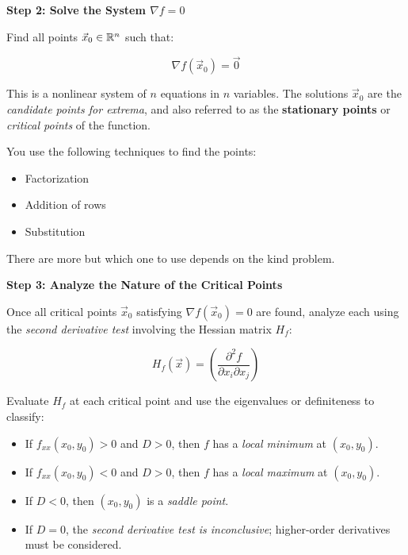 \textbf{Step 2: Solve the System \( \nabla f = 0 \)}

Find all points \( \vec{x}_0 \in \mathbb{R}^n \) such that:

\[
    \nabla f(\vec{x}_0) = \vec{0}
\]

This is a nonlinear system of \( n \) equations in \( n \) variables. The solutions \( \vec{x}_0 \) 
are the \emph{candidate points for extrema}, and also referred to as the 
\textbf{stationary points} or \emph{critical points} of the function.
\vspace{\baselineskip}

You use the following techniques to find the points: 

\begin{itemize}

    \item Factorization

    \item Addition of rows

    \item Substitution

\end{itemize}

There are more but which one to use depends on the kind problem.
\vspace{\baselineskip}

\textbf{Step 3: Analyze the Nature of the Critical Points}

Once all critical points \( \vec{x}_0 \) satisfying \( \nabla f(\vec{x}_0) = 0 \) are found, analyze 
each using the \emph{second derivative test} involving the Hessian matrix \( H_f \):

\[
    H_f(\vec{x}) = \left( \frac{\partial^2 f}{\partial x_i \partial x_j} \right)
\]

Evaluate \( H_f \) at each critical point and use the eigenvalues or definiteness to classify:

\begin{itemize}

    \item If \( f_{xx}(x_0, y_0) > 0 \) and \( D > 0 \), then \( f \) has a \emph{local minimum} at 
          \( (x_0, y_0) \).

    \item If \( f_{xx}(x_0, y_0) < 0 \) and \( D > 0 \), then \( f \) has a \emph{local maximum} at 
          \( (x_0, y_0) \).

    \item If \( D < 0 \), then \( (x_0, y_0) \) is a \emph{saddle point}.

    \item If \( D = 0 \), the \emph{second derivative test is inconclusive}; higher-order derivatives 
          must be considered.

\end{itemize}

